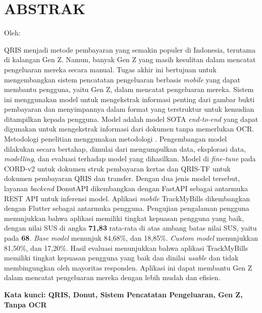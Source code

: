 \clearpage
\chapter*{ABSTRAK}
\begin{center}
	\center
	\begin{singlespace}
		\large\bfseries{\thetitle}

		\normalfont\normalsize
		Oleh:

		\bfseries \theauthor
	\end{singlespace}
\end{center}

\begin{singlespace}
	QRIS menjadi metode pembayaran yang semakin populer di Indonesia, terutama di kalangan Gen Z. Namun, banyak Gen Z yang masih kesulitan dalam mencatat pengeluaran mereka secara manual. Tugas akhir ini bertujuan untuk mengembangkan sistem pencatatan pengeluaran berbasis \emph{mobile} yang dapat membantu pengguna, yaitu Gen Z, dalam mencatat pengeluaran mereka. Sistem ini menggunakan model \donut{} untuk mengekstrak informasi penting dari gambar bukti pembayaran dan menyimpannya dalam format yang terstruktur untuk kemudian ditampilkan kepada pengguna. Model \donut{} adalah model SOTA \emph{end-to-end} yang dapat digunakan untuk mengekstrak informasi dari dokumen tanpa memerlukan OCR. Metodologi penelitian menggunakan metodologi \dsrm. Pengembangan model dilakukan secara bertahap, dimulai dari mengumpulkan data, eksplorasi data, \emph{modelling}, dan evaluasi terhadap model yang dihasilkan. Model \donut{} di \emph{fine-tune} pada \dataset{} CORD-v2 untuk dokumen struk pembayaran kertas dan \dataset{} QRIS-TF untuk dokumen pembayaran QRIS dan transfer. Dengan dua jenis model tersebut, layanan \emph{backend} DonutAPI dikembangkan dengan FastAPI sebagai antarmuka REST API untuk inferensi model. Aplikasi \emph{mobile} TrackMyBills dikembangkan dengan Flutter sebagai antarmuka pengguna. Pengujian pengalaman pengguna menunjukkan bahwa aplikasi memiliki tingkat kepuasan pengguna yang baik, dengan nilai SUS di angka \textbf{71,83} rata-rata di atas ambang batas nilai SUS, yaitu pada \textbf{68}.  \emph{Base model} menunjuk \fscore{} 84,68\%, dan \mcer{} 18,85\%. \emph{Custom model} menunjukkan  \fscore{} 81,50\%, dan \mcer{} 17,20\%. Hasil evaluasi menunjukkan bahwa aplikasi TrackMyBills memiliki tingkat kepuasan pengguna yang baik dan dinilai \emph{usable} dan tidak membingungkan oleh mayoritas responden. Aplikasi ini dapat membantu Gen Z dalam mencatat pengeluaran mereka dengan lebih mudah dan efisien.

	\textbf{Kata kunci: QRIS, Donut, Sistem Pencatatan Pengeluaran, Gen Z, Tanpa OCR}

\end{singlespace}
\clearpage